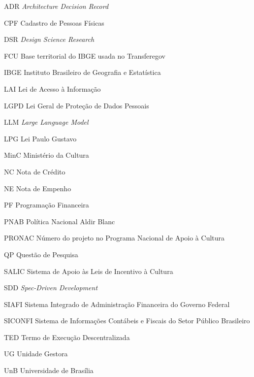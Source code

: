 \begin{siglas}
  \item[ADR] \textit{Architecture Decision Record}
  \item[CPF] Cadastro de Pessoas Físicas
  \item[DSR] \textit{Design Science Research}
  \item[FCU] Base territorial do IBGE usada no Transferegov
  \item[IBGE] Instituto Brasileiro de Geografia e Estatística
  \item[LAI] Lei de Acesso à Informação
  \item[LGPD] Lei Geral de Proteção de Dados Pessoais
  \item[LLM] \textit{Large Language Model}
  \item[LPG] Lei Paulo Gustavo
  \item[MinC] Ministério da Cultura
  \item[NC] Nota de Crédito
  \item[NE] Nota de Empenho
  \item[PF] Programação Financeira
  \item[PNAB] Política Nacional Aldir Blanc
  \item[PRONAC] Número do projeto no Programa Nacional de Apoio à Cultura
  \item[QP] Questão de Pesquisa
  \item[SALIC] Sistema de Apoio às Leis de Incentivo à Cultura
  \item[SDD] \textit{Spec-Driven Development}
  \item[SIAFI] Sistema Integrado de Administração Financeira do Governo Federal
  \item[SICONFI] Sistema de Informações Contábeis e Fiscais do Setor Público Brasileiro
  \item[TED] Termo de Execução Descentralizada
  \item[UG] Unidade Gestora
  \item[UnB] Universidade de Brasília
\end{siglas}
